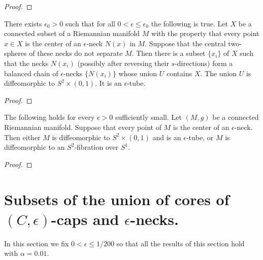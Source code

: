 \begin{proof}
\sketch
{}
\end{proof}

\begin{proposition}
\label{prop:balanced-chain-covers-connected-set}
\label{epschains}
There exists $\epsilon_0>0$ such that for all $0<\epsilon\le
\epsilon_0$ the following is true. Let $X$ be a connected subset of
a Riemannian manifold $M$ with the property that every point $x\in
X$ is the center of an $\epsilon$-neck $N(x)$ in $M$. Suppose that
the central two-spheres of these necks do not separate $M$. Then
there is a subset $\{x_i\}$ of $X$ such that the necks $N(x_i)$
(possibly after reversing their $s$-directions) form a balanced
chain of $\epsilon$-necks $\{N(x_i)\}$ whose union $U$ contains $X$.
The union $U$ is diffeomorphic to $S^2\times (0,1)$. It is an
$\epsilon$-tube.
\end{proposition}

\begin{proof}
\sketch
{}
\end{proof}

\begin{lemma}
\label{lem:manifold-covered-by-necks-classification}
\label{S2times01}
The following holds for every $\epsilon>0$ sufficiently small. Let
$(M,g)$ be a connected Riemannian manifold. Suppose that every point
of $M$ is the center of an $\epsilon$-neck. Then either $M$ is
diffeomorphic to $S^2\times (0,1)$ and is an $\epsilon$-tube, or $M$
is diffeomorphic to an $S^2$-fibration over $S^1$.
\end{lemma}

\begin{proof}
\sketch
{}
\end{proof}


\section{Subsets of the union of cores of $(C,\epsilon)$-caps
and $\epsilon$-necks.} In this section we fix $0<\epsilon\le 1/200$
so that all the results of this section hold with $\alpha=0.01$.

